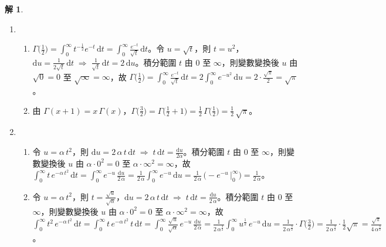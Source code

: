 \documentclass[12pt]{extarticle}
\newcommand{\ds}{\displaystyle}
\newcommand{\ie}{\;\Longrightarrow\;}
\theoremstyle{definition}
\newtheorem*{sol}{解}
\begin{document}
\begin{sol}
\begin{enumerate}
    \item 
      \begin{enumerate}\setlength{\itemsep}{0pt}
        \item $\ds\Gamma\Big(\frac{1}{2}\Big)=\int_{0}^{\infty} t^{-\frac{1}{2}} e^{-t}\,\mathrm{d}t = \int_{0}^{\infty}\frac{e^{-t}}{\sqrt{t}}\,\mathrm{d}t$。令 $\ds u = \sqrt{t}$，則 $\ds t = u^2$，$\ds\mathrm{d}u = \frac{1}{2\sqrt{t}}\,\mathrm{d}t \ie \frac{1}{\sqrt{t}}\,\mathrm{d}t = 2\,\mathrm{d}u$。積分範圍 $t$ 由 $0$ 至 $\infty$，則變數變換後 $u$ 由 $\ds\sqrt{0} = 0$ 至 $\ds\sqrt{\infty} = \infty$，故 $\ds\Gamma\Big(\frac{1}{2}\Big) = \int_{0}^{\infty}\frac{e^{-t}}{\sqrt{t}}\,\mathrm{d}t = 2\int_0^\infty e^{-u^2}\,\mathrm{d}u = 2\cdot\frac{\sqrt{\pi}}{2} = \sqrt{\pi}$。
        \item 由 $\ds\Gamma(x + 1) = x\,\Gamma(x)$，$\ds\Gamma\Big(\frac{3}{2}\Big) = \Gamma\Big(\frac{1}{2} + 1\Big) = \frac{1}{2}\,\Gamma\Big(\frac{1}{2}\Big) = \frac{1}{2}\,\sqrt{\pi}$。
      \end{enumerate}
    \item
      \begin{enumerate}\setlength{\itemsep}{0pt}
        \item 令 $\ds u = \alpha\,t^2$，則 $\ds\mathrm{d}u = 2\,\alpha\,t\,\mathrm{d}t \ie t\,\mathrm{d}t = \frac{\mathrm{d}u}{2\alpha}$。積分範圍 $t$ 由 $0$ 至 $\infty$，則變數變換後 $u$ 由 $\ds\alpha\cdot0^2 = 0$ 至 $\ds\alpha\cdot\infty^2 = \infty$，故 $\ds\int_0^\infty t\,e^{-\alpha\,t^2}\,\mathrm{d}t = \int_0^\infty\!e^{-u}\,\frac{\mathrm{d}u}{2\,\alpha} = \frac{1}{2\,\alpha}\int_0^\infty\!e^{-u}\,\mathrm{d}u = \frac{1}{2\,\alpha}\,\Big(-e^{-u}\,\Big|_0^\infty\Big) = \frac{1}{2\,\alpha}$。
        \item 令 $\ds u = \alpha\,t^2$，則 $\ds t = \frac{\sqrt{u}}{\sqrt{\alpha}}$，$\ds\mathrm{d}u = 2\,\alpha\,t\,\mathrm{d}t \ie t\,\mathrm{d}t = \frac{\mathrm{d}u}{2\,\alpha}$。積分範圍 $t$ 由 $0$ 至 $\infty$，則變數變換後 $u$ 由 $\ds\alpha\cdot0^2 = 0$ 至 $\ds\alpha\cdot\infty^2 = \infty$，故 $\ds\int_0^\infty\!t^2\,e^{-\alpha\,t^2}\,\mathrm{d}t = \int_0^\infty\!t\,e^{-\alpha\,t^2}\,t\,\mathrm{d}t = \int_0^\infty\!\frac{\sqrt{u}}{\sqrt{\alpha}}\,e^{-u}\,\frac{\mathrm{d}u}{2\,\alpha} = \frac{1}{2\,\alpha^{\frac{3}{2}}}\int_0^\infty\!u^{\frac{1}{2}}\,e^{-u}\,\mathrm{d}u = \frac{1}{2\,\alpha^{\frac{3}{2}}}\cdot\Gamma\Big(\frac{3}{2}\Big) = \frac{1}{2\,\alpha^{\frac{3}{2}}}\cdot\frac{1}{2}\sqrt{\pi} = \frac{\sqrt{\pi}}{4\,\alpha^{\frac{3}{2}}}$。
      \end{enumerate}
  \end{enumerate}
\end{sol}
\end{document}
